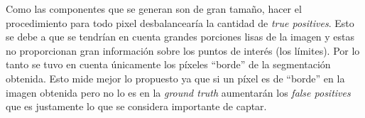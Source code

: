 \indent Como las componentes que se generan son de gran tama\~no, hacer el procedimiento para todo pixel desbalancear\'ia la cantidad de \textit{true positives}. Esto se debe a que se tendr\'ian en cuenta grandes porciones lisas de la imagen y estas no proporcionan gran informaci\'on sobre los puntos de interés (los l\'imites). Por lo tanto se tuvo en cuenta \'unicamente los píxeles ``borde'' de la segmentaci\'on obtenida. Esto mide mejor lo propuesto ya que si un píxel es de ``borde'' en la imagen obtenida pero no lo es en la \textit{ground truth} aumentarán los \textit{false positives} que es justamente lo que se considera importante de captar.

\begin{figure}[H]
	\begin{center}
	\hspace{3mm}
	\caption{}
	\end{center}
	\label{Fscores}
\end{figure}
\vspace{-7mm} 

